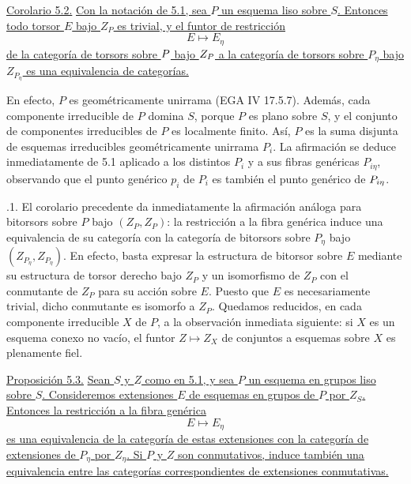 \medskip
\noindent\underline{Corolario 5.2.} \underline{Con la notación de
5.1, sea $P$ un esquema liso sobre $S$. Entonces todo torsor $E$ bajo
$Z_P$ es trivial, y el funtor de restricción}
\[
 E\longmapsto E_\eta
\]
\underline{de la categoría de torsors sobre
$\sisi{P_\eta}{P}$ bajo $\sisi{Z_{P_\eta}}{Z_P}$ a la categoría de
torsors sobre $P_\eta$ bajo $Z_{P_\eta}$ es una equivalencia de
categorías.}


En efecto, $P$ es geométricamente unirrama (EGA IV 17.5.7). Además,
cada componente irreducible de $P$ domina $S$, porque $P$ es plano
sobre $S$, y el conjunto de componentes irreducibles de $P$ es
localmente finito. Así, $P$ es la suma disjunta de esquemas irreducibles
geométricamente unirrama $P_i$. La afirmación se deduce inmediatamente
de 5.1 aplicado a los distintos $P_i$ y a sus fibras genéricas
$P_{i\eta}$, observando que el punto genérico $p_i$ de $P_i$ es también
el punto genérico de $P_{\sisi{i}{i\eta}}$.

\medskip
{}.1. El corolario precedente da inmediatamente la
afirmación análoga para bitorsors sobre $P$ bajo $(Z_P,Z_P)$: la
restricción a la fibra genérica induce una equivalencia de su categoría
con la categoría de bitorsors sobre $P_\eta$ bajo
$(Z_{P_\eta},Z_{P_\eta})$. En efecto, basta expresar la estructura de
bitorsor sobre $E$ mediante su estructura de torsor derecho bajo $Z_P$
y un isomorfismo de $Z_P$ con el conmutante de $Z_P$ para su acción
sobre $E$. Puesto que $E$ es necesariamente trivial, dicho conmutante
es isomorfo a $Z_P$. Quedamos reducidos, en cada componente irreducible
$X$ de $P$, a la observación inmediata siguiente: si $X$ es un esquema
conexo no vacío, el funtor $Z\mapsto Z_X$ de conjuntos a esquemas sobre
$X$ es plenamente fiel.


\medskip
\noindent\underline{Proposición 5.3.} \underline{Sean $S$ y $Z$ como
en 5.1, y sea $P$ un esquema en grupos liso sobre $S$. Consideremos
extensiones $E$ de esquemas en grupos de $P$ por $Z_S$. Entonces la
restricción a la fibra genérica}
\[
 E\longmapsto E_\eta
\]
\underline{es una equivalencia de la categoría de estas extensiones
con la categoría de extensiones de $P_\eta$ por $Z_\eta$. Si $P$ y $Z$
son conmutativos, induce también una equivalencia entre las categorías
correspondientes de extensiones conmutativas.}

